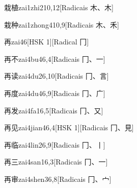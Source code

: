 \begin{entry}{栽植}{zai1zhi2}{10,12}[Radicais ⽊、⽊]
\end{entry}

\begin{entry}{栽种}{zai1zhong4}{10,9}[Radicais ⽊、⽲]
\end{entry}

\begin{entry}{再}{zai4}{6}[HSK 1][Radical ⼌]
\end{entry}

\begin{entry}{再不}{zai4bu4}{6,4}[Radicais ⼌、⼀]
\end{entry}

\begin{entry}{再读}{zai4du2}{6,10}[Radicais ⼌、⾔]
\end{entry}

\begin{entry}{再度}{zai4du4}{6,9}[Radicais ⼌、⼴]
\end{entry}

\begin{entry}{再发}{zai4fa1}{6,5}[Radicais ⼌、⼜]
\end{entry}

\begin{entry}{再见}{zai4jian4}{6,4}[HSK 1][Radicais ⼌、⾒]
\end{entry}

\begin{entry}{再临}{zai4lin2}{6,9}[Radicais ⼌、⼁]
\end{entry}

\begin{entry}{再三}{zai4san1}{6,3}[Radicais ⼌、⼀]
\end{entry}

\begin{entry}{再审}{zai4shen3}{6,8}[Radicais ⼌、⼧]
\end{entry}

